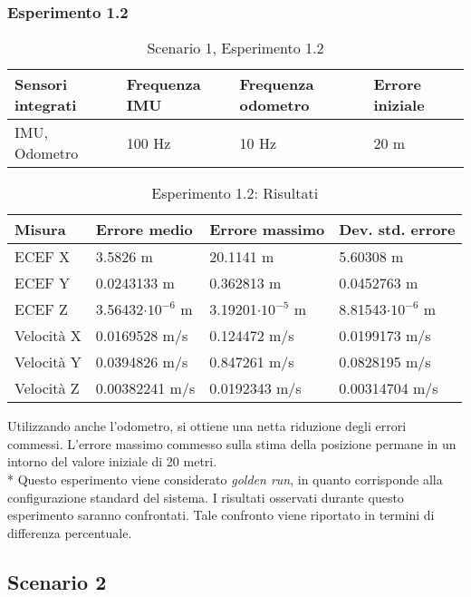 \subsubsection{Esperimento 1.2}
\begin{table}[h]
	\centering
	\begin{tabular}{|p{3cm}|p{2.75cm}|p{2.75cm}|p{2.75cm}|}
	\hline 
	\textbf{Sensori integrati} & \textbf{Frequenza IMU}  & \textbf{Frequenza odometro} & \textbf{Errore iniziale} \\ 
	\hline 
		IMU, Odometro & 100 Hz & 10 Hz & 20 m\\ 
		\hline 
	\end{tabular}
	\caption{Scenario 1, Esperimento 1.2}
	\label{tab:exp12}
\end{table}
\begin{table}[h]
	\centering
	\begin{tabular}{|p{2cm}|p{3cm}|p{3cm}|p{3cm}|}
		\hline 
		\textbf{Misura} & \textbf{Errore medio}  & \textbf{Errore massimo} & \textbf{Dev. std. errore}\\ 
		\hline 
		ECEF X & 3.5826 m & 20.1141 m & 5.60308 m \\ 
		\hline 
		ECEF Y & 0.0243133 m & 0.362813 m & 0.0452763 m \\ 
		\hline 
		ECEF Z & 3.56432$\cdot10^{-6}$ m & 3.19201$\cdot10^{-5}$ m & 8.81543$\cdot10^{-6}$ m \\ 
		\hline 
		Velocit\`a X & 0.0169528 m/s & 0.124472 m/s & 0.0199173 m/s \\ 
		\hline 
		Velocit\`a Y & 0.0394826 m/s & 0.847261 m/s & 0.0828195 m/s \\ 
		\hline 
		Velocit\`a Z & 0.00382241 m/s & 0.0192343 m/s & 0.00314704 m/s \\ 
		\hline 
	\end{tabular}
	\caption{Esperimento 1.2: Risultati}
	\label{tab:exp12res}
\end{table}
Utilizzando anche l'odometro, si ottiene una netta riduzione degli errori commessi. L'errore massimo commesso sulla stima della posizione permane in un intorno del valore iniziale di 20 metri.\\*
Questo esperimento viene considerato \emph{golden run}, in quanto corrisponde alla configurazione standard del sistema. I risultati osservati durante questo esperimento saranno confrontati. Tale confronto viene riportato in termini di differenza percentuale.
\subsection{Scenario 2}

